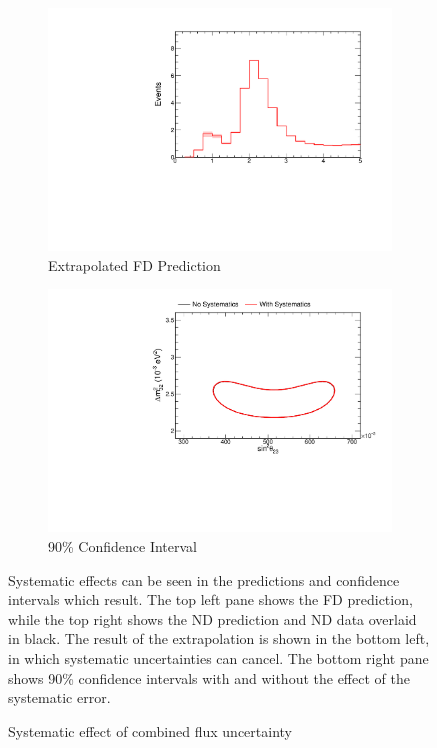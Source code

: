 \begin{figure}
\begin{center}
\begin{subfigure}[c]{0.49\textwidth}
\includegraphics[width=\textwidth]{figures/systs/prediction/fd_extrap_prediction_allBeam.pdf}
\caption*{Extrapolated FD Prediction}
\end{subfigure}
\begin{subfigure}[c]{0.49\textwidth}
\includegraphics[width=\textwidth]{figures/systs/prediction/fd_extrap_contour_allBeam.pdf}
\caption*{90\% Confidence Interval}
\end{subfigure}
\end{center}
\caption{Systematic effect of combined flux uncertainty}{
Systematic effects can be seen in the predictions and confidence intervals
which result.
The top left pane shows the FD prediction, while the top right shows the
ND prediction and ND data overlaid in black.
The result of the extrapolation is shown in the bottom left, in which
systematic uncertainties can cancel.
The bottom right pane shows 90\% confidence intervals with and without
the effect of the systematic error.}
\label{syst_fig_allBeam}

\end{figure}



